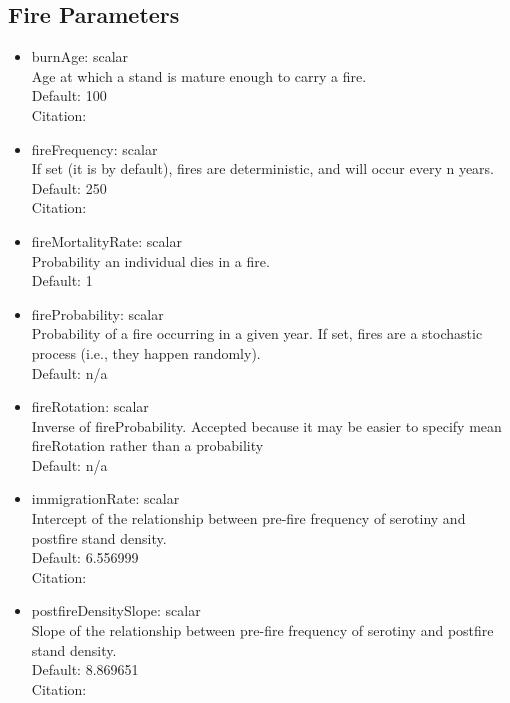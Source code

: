 \documentclass[12pt, english]{article}
\begin{document}
\subsection{Fire Parameters}
\begin{itemize}
	\item{burnAge: scalar\\Age at which a stand is mature enough to carry a fire.\\Default: 100\\Citation: \citealt{Turner1994}}
	\item{fireFrequency: scalar\\If set (it is by default), fires are deterministic, and will occur every n years.\\Default: 250\\Citation: \citealt{Schoennagel2003}}
	\item{fireMortalityRate: scalar\\Probability an individual dies in a fire.\\Default: 1}
	\item{fireProbability: scalar\\Probability of a fire occurring in a given year. If set, fires are a stochastic process (i.e., they happen randomly).\\Default: n/a}
	\item{fireRotation: scalar\\Inverse of fireProbability. Accepted because it may be easier to specify mean fireRotation rather than a probability\\Default: n/a}
	\item{immigrationRate: scalar\\Intercept of the relationship between pre-fire frequency of serotiny and postfire stand density.\\Default: 6.556999 \\
	Citation: \citealt{Turner2003, Benkman2008}}
	\item{postfireDensitySlope: scalar\\Slope of the relationship between pre-fire frequency of serotiny and postfire stand density.\\Default: 8.869651 \\
	Citation: \citealt{Turner2003, Benkman2008}}
\end{itemize}
\end{document}
